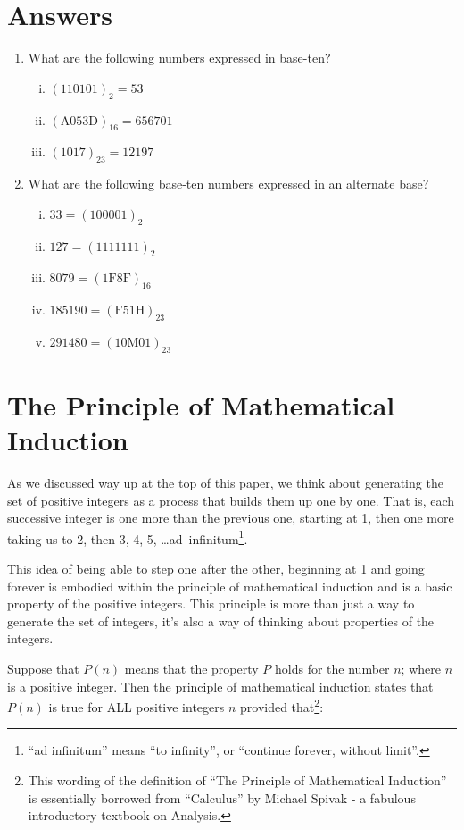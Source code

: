 \documentclass{article}
\begin{document}
\section*{Answers}
\begin{enumerate}
\item What are the following numbers expressed in base-ten?
\begin{enumerate}[i)]
\item $(110101)_2 = 53$
\item $(\text{A}053\text{D})_{16}=656701$
\item $(1017)_{23} = 12197$
\end{enumerate}
\item What are the following base-ten numbers expressed in an alternate base?
\begin{enumerate}[i)]
\item $33 = (100001)_2$
\item $127 = (1111111)_2$
\item $8079 = (1\text{F}8\text{F})_{16}$
\item $185190 = (\text{F}51\text{H})_{23}$
\item $291480 = (10\text{M}01)_{23}$
\end{enumerate}
\end{enumerate}










\break
\section*{The Principle of Mathematical Induction}

As we discussed way up at the top of this paper,
we think about generating the set of positive integers as a process that builds them up one by one.
That is, each successive integer is one more than the previous one,
starting at 1, then one more
taking us to 2,
then 3, 4, 5, \dots{}ad~infinitum\footnote{``ad
infinitum'' means ``to infinity'', or ``continue forever, without limit''.}.

This idea of being able to step one after the other,
beginning at 1 and going forever is embodied within the principle of mathematical
induction and is a basic property of the positive integers.
This principle is more than just a way to generate the set of integers,
it's also a way of thinking about properties of the integers.

Suppose
that $P(n)$ means that the property $P$ holds
for the number $n$; where $n$ is a positive integer.
Then the principle of mathematical induction states that $P(n)$
is true for ALL positive integers $n$ provided that\footnote{This wording of the
definition of ``The Principle of Mathematical Induction'' is essentially borrowed
from ``Calculus'' by Michael Spivak - a fabulous introductory textbook on Analysis.}:
\end{document}
